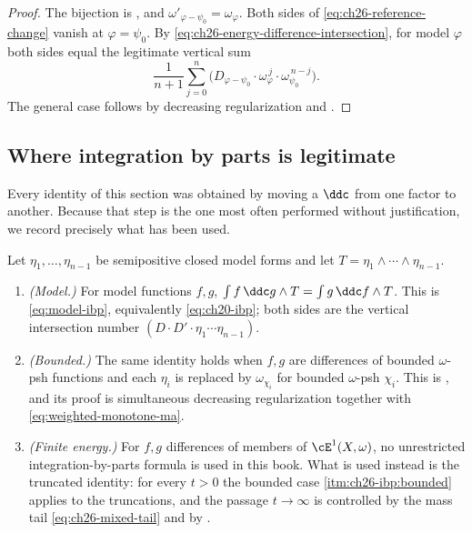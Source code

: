 \begin{proof}
The bijection is , and
$\omega'_{\varphi-\psi_0}=\omega_\varphi$.  Both sides of
\eqref{eq:ch26-reference-change} vanish at $\varphi=\psi_0$.  By
\eqref{eq:ch26-energy-difference-intersection}, for model $\varphi$ both
sides equal the legitimate vertical sum
\[
 \frac1{n+1}\sum_{j=0}^n
 \bigl(D_{\varphi-\psi_0}\cdot\omega_\varphi^{\,j}
                  \cdot\omega_{\psi_0}^{\,n-j}\bigr).
\]
The general case follows by decreasing
regularization and .
\end{proof}

\subsection{Where integration by parts is legitimate}
\label{sec:ch26-ibp-scope}

Every identity of this section was obtained by moving a $\ddc$ from one
factor to another.  Because that step is the one most often performed without
justification, we record precisely what has been used.

\begin{proposition}
\label{prop:ch26-ibp-regimes}
Let $\eta_1,\ldots,\eta_{n-1}$ be semipositive closed model forms and let
$T=\eta_1\wedge\cdots\wedge\eta_{n-1}$.
\begin{enumerate}
\item\label{itm:ch26-ibp:model}
 \emph{(Model.)}  For model functions $f,g$,
 $\int f\,\ddc g\wedge T=\int g\,\ddc f\wedge T$.  This is
 \eqref{eq:model-ibp}, equivalently \eqref{eq:ch20-ibp}; both sides are the
 vertical intersection number $(D\cdot D'\cdot\eta_1\cdots\eta_{n-1})$.
\item\label{itm:ch26-ibp:bounded}
 \emph{(Bounded.)}  The same identity holds when $f,g$ are differences of
 bounded $\omega$-psh functions and each $\eta_i$ is replaced by
 $\omega_{\chi_i}$ for bounded $\omega$-psh $\chi_i$.  This is
 , and its proof is simultaneous
 decreasing regularization together with
 \eqref{eq:weighted-monotone-ma}.
\item\label{itm:ch26-ibp:finite-energy}
 \emph{(Finite energy.)}  For $f,g$ differences of members of
 $\cE^1(X,\omega)$, no unrestricted integration-by-parts formula is used in
 this book.  What is used instead is the truncated identity: for every
 $t>0$ the bounded case \cref{itm:ch26-ibp:bounded} applies to the
 truncations, and the passage $t\to\infty$ is controlled by the mass tail
 \eqref{eq:ch26-mixed-tail} and by .
\end{enumerate}
\end{proposition}

